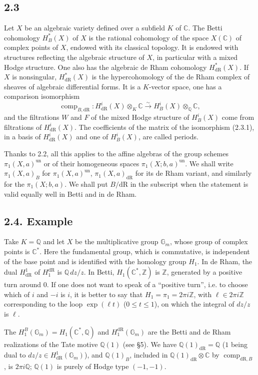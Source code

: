 \documentclass[10pt]{article}
\newcommand{\Q}{\mathbb Q}
\newcommand{\Z}{\mathbb Z}
\newcommand{\C}{\mathbb C}
\newcommand{\Gm}{\mathbb G_m}
\newcommand{\comp}{\operatorname{comp}}
\newcommand{\dR}{\mathrm{dR}}
\begin{document}
\subsection*{2.3}
Let $X$ be an algebraic variety defined over a subfield $K$ of $\C$.
The Betti cohomology $H^*_B(X)$ of $X$ is the rational cohomology of the space $X(\C)$ of complex points of $X$, endowed with its classical topology.
It is endowed with structures reflecting the algebraic structure of $X$, in particular with a mixed Hodge structure.
One also has the algebraic de Rham cohomology $H^*_{\dR}(X)$.
If $X$ is nonsingular, $H^*_{\dR}(X)$ is the hypercohomology of the de Rham complex of sheaves of algebraic differential forms.
It is a $K$-vector space, one has a comparison isomorphism
\begin{equation}
\comp_{B,\dR}:H^i_{\dR}(X)\otimes_K\C\xrightarrow{\sim}H^i_B(X)\otimes_\Q\C,
\tag{2.3.1}
\end{equation}
and the filtrations $W$ and $F$ of the mixed Hodge structure of $H^i_B(X)$ come from filtrations of $H^i_{\dR}(X)$.
The coefficients of the matrix of the isomorphism (2.3.1), in a basis of $H^i_{\dR}(X)$ and one of $H^i_B(X)$, are called periods.

Thanks to 2.2, all this applies to the affine algebras of the group schemes $\pi_1(X,a)^{\mathrm{un}}$ or of their homogeneous spaces $\pi_1(X;b,a)^{\mathrm{un}}$.
We shall write $\pi_1(X,a)_B$ for $\pi_1(X,a)^{\mathrm{un}}$, $\pi_1(X,a)_{\dR}$ for its de Rham variant, and similarly for the $\pi_1(X;b,a)$.
We shall put $B/\dR$ in the subscript when the statement is valid equally well in Betti and in de Rham.

\subsection*{2.4. Example}
Take $K=\Q$ and let $X$ be the multiplicative group $\Gm$, whose group of complex points is $\C^*$.
Here the fundamental group, which is commutative, is independent of the base point and is identified with the homology group $H_1$.
In de Rham, the dual $H^1_{\dR}$ of $H^{\dR}_1$ is $\Q\,dz/z$.
In Betti, $H_1(\C^*,\Z)$ is $\Z$, generated by a positive turn around $0$.
If one does not want to speak of a ``positive turn'', i.e. to choose which of $i$ and $-i$ is $i$, it is better to say that $H_1=\pi_1=2\pi i\Z$, with $\ell\in2\pi i\Z$ corresponding to the loop $\exp(\ell t)$ ($0\leq t\leq1$), on which the integral of $dz/z$ is $\ell$.

The $H^B_1(\Gm)=H_1(\C^*,\Q)$ and $H^{\dR}_1(\Gm)$ are the Betti and de Rham realizations of the Tate motive $\Q(1)$ (see \S5).
We have $\Q(1)_{\dR}=\Q$ ($1$ being dual to $dz/z\in H^1_{\dR}(\Gm)$), and $\Q(1)_B$, included in $\Q(1)_{\dR}\otimes\C$ by $\comp_{\dR,B}$, is $2\pi i\Q$; $\Q(1)$ is purely of Hodge type $(-1,-1)$.
\end{document}
